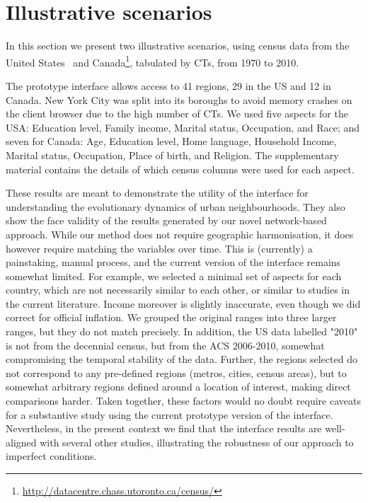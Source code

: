 \section{Illustrative scenarios}
\label{sec:study}

In this section we present two illustrative scenarios, using census data from
the United States~\citep{nhgis} and
Canada\footnote{\url{http://datacentre.chass.utoronto.ca/census/}}, tabulated by
CTs,  from 1970 to 2010. 

The prototype interface allows access to 41 regions, 29 in the US and
12 in Canada. New York City was split into its boroughs to avoid
memory crashes on the client browser due to the high number of CTs.
We used five aspects for the USA: Education level, Family income,
Marital status, Occupation, and Race; and seven for Canada: Age,
Education level, Home language, Household Income, Marital status,
Occupation, Place of birth, and Religion. The supplementary material
contains the details of which census columns were used for each
aspect.



These results are meant to demonstrate the utility of the interface for
understanding the evolutionary dynamics of urban neighbourhoods. They also show
the face validity of the results generated by our novel network-based approach.
While our method does not require geographic harmonisation, it does however
require matching the variables over time. This is (currently) a painstaking,
manual process, and the current version of the interface remains somewhat
limited. For example, we selected a minimal set of aspects for each country,
which are not necessarily similar to each other, or similar to studies in the
current literature. Income moreover is slightly inaccurate, even though we did
correct for official inflation. We grouped the original ranges into three larger
ranges, but they do not match precisely. In addition, the US data labelled
"2010" is not from the decennial census, but from the ACS 2006-2010, somewhat
compromising the temporal stability of the data. Further, the regions selected
do not correspond to any pre-defined regions (metros, cities, census areas), but
to somewhat arbitrary regions defined around a location of interest, making
direct comparisons harder.  Taken together, these factors would no doubt require
caveats for a substantive study using the current prototype version of the
interface. Nevertheless, in the present context we find that the interface
results are well-aligned with several other studies, illustrating the robustness
of our approach to imperfect conditions.


